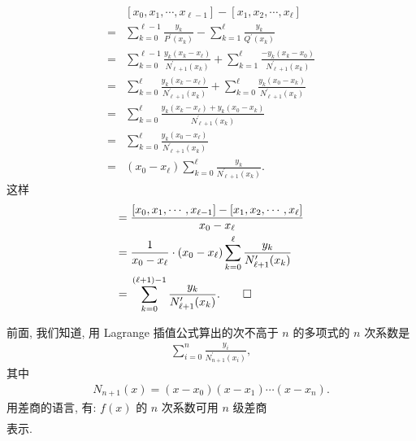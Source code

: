 \begin{pf}
\begin{align*}
             & [x_{0}, x_{1}, \cdots, x_{\ell - 1}] - [x_{1}, x_{2},
        \cdots, x_{\ell}]                                            \\
        = {} & \sum_{k = 0}^{\ell-1} \frac{y_k}{P^{\prime} (x_k)}
        - \sum_{k = 1}^{\ell} \frac{y_k}{Q^{\prime} (x_k)}           \\
        = {} & \sum_{k = 0}^{\ell-1} \frac{y_k (x_k - x_{\ell})}
        {N_{\ell + 1}^{\prime} (x_k)}
        + \sum_{k = 1}^{\ell} \frac{-y_k (x_k - x_0)}
        {N_{\ell + 1}^{\prime} (x_k)}                                \\
        = {} & \sum_{k = 0}^{\ell} \frac{y_k (x_k - x_{\ell})}
        {N_{\ell + 1}^{\prime} (x_k)}
        + \sum_{k = 0}^{\ell} \frac{y_k (x_0 - x_k)}
        {N_{\ell + 1}^{\prime} (x_k)}                                \\
        = {} & \sum_{k = 0}^{\ell} \frac{y_k (x_k - x_{\ell})
            + y_k (x_0 - x_k)}
        {N_{\ell + 1}^{\prime} (x_k)}                                \\
        = {} & \sum_{k = 0}^{\ell} \frac{y_k (x_0 - x_{\ell})}
        {N_{\ell + 1}^{\prime} (x_k)}                                \\
        = {} & (x_0 - x_{\ell}) \sum_{k = 0}^{\ell} \frac{y_k}
        {N_{\ell + 1}^{\prime} (x_k)}.
    \end{align*}
    这样
    \begin{align*}
        [x_{0}, x_{1}, \cdots, x_{\ell}]
        = {} & \frac{[x_{0}, x_{1}, \cdots, x_{\ell - 1}]
        - [x_{1}, x_{2}, \cdots, x_{\ell}]}{x_0 - x_{\ell}}          \\
        = {} & \frac{1}{x_0 - x_{\ell}} \cdot (x_0 - x_{\ell})
        \sum_{k = 0}^{\ell} \frac{y_k} {N_{\ell + 1}^{\prime} (x_k)} \\
        = {} & \sum_{k = 0}^{(\ell + 1) - 1} \frac{y_k}
        {N_{\ell + 1}^{\prime} (x_k)}. \qedhere
    \end{align*}
\end{pf}

\begin{remark}
    前面, 我们知道, 用 Lagrange 插值公式算出的次不高于 $n$ 的多项式的 $n$ 次系数是
    \begin{align*}
        \sum_{i = 0}^{n} \frac{y_i}{N_{n+1}^{\prime} (x_i)},
    \end{align*}
    其中
    \begin{align*}
        N_{n+1} (x) = (x - x_0) (x - x_1) \cdots (x - x_n).
    \end{align*}
    用差商的语言, 有: $f(x)$ 的 $n$ 次系数可用 $n$ 级差商
    \begin{align*}
        [x_0, x_1, \cdots, x_n]
    \end{align*}
    表示.
\end{remark}

